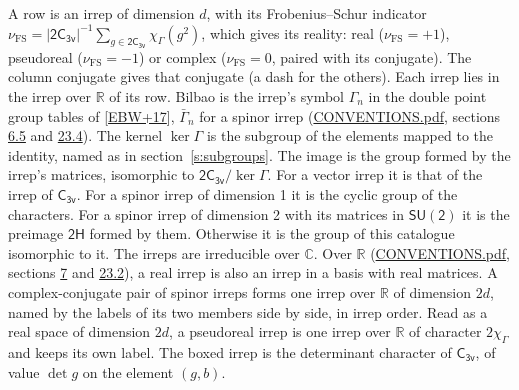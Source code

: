 \documentclass[10pt,a4paper]{article}
\numberwithin{equation}{section}
\newcommand{\grp}[1]{\mathsf{#1}}
\newcommand{\irchar}[1]{\chi_{#1}}
\newcommand{\fsind}{\nu_{\mathrm{FS}}}
\begin{document}
\leavevmode\label{n:index.frobenius}\label{n:head.irrep}\label{n:head.reality}A row is an irrep of dimension $d$, with its Frobenius--Schur indicator $\fsind = |\grp{2C_{3v}}|^{-1}\allowbreak\sum_{g\in\grp{2C_{3v}}}\irchar{\Gamma}(g^2)$, which gives its reality: real ($\fsind = +1$), pseudoreal ($\fsind = -1$) or complex ($\fsind = 0$, paired with its conjugate). \label{n:head.conjugate}The column conjugate gives that conjugate (a dash for the others). \label{n:head.over.real}Each irrep lies in the irrep over $\mathbb{R}$ of its row. \label{n:head.bilbao}\label{n:irrep.alias.gamma}Bilbao is the irrep's symbol $\Gamma_n$ in the double point group tables of [\href{../../../REFERENCES.pdf\#ref.EBW+17}{EBW+17}], $\bar{\Gamma}_n$ for a spinor irrep (\href{../../CONVENTIONS.pdf}{CONVENTIONS.pdf}, sections \href{../../../rotation/CONVENTIONS.pdf\#conv.6.5}{6.5} and \href{../../CONVENTIONS.pdf\#conv.23.4}{23.4}). \label{n:head.kernel}The kernel $\ker\Gamma$ is the subgroup of the elements mapped to the identity, named as in section~\ref{s:subgroups}. \label{n:head.image}The image is the group formed by the irrep's matrices, isomorphic to $\grp{2C_{3v}}/\ker\Gamma$. For a vector irrep it is that of the irrep of \href{../../../rotation/data/pdf/C3v.pdf}{$\grp{C_{3v}}$}. For a spinor irrep of dimension 1 it is the cyclic group of the characters. For a spinor irrep of dimension 2 with its matrices in $\grp{SU(2)}$ it is the preimage $\grp{2H}$ formed by them. Otherwise it is the group of this catalogue isomorphic to it. The irreps are irreducible over $\mathbb{C}$. Over $\mathbb{R}$ (\href{../../CONVENTIONS.pdf}{CONVENTIONS.pdf}, sections \href{../../../rotation/CONVENTIONS.pdf\#conv.7}{7} and \href{../../CONVENTIONS.pdf\#conv.23.2}{23.2}), a real irrep is also an irrep in a basis with real matrices. A complex-conjugate pair of spinor irreps forms one irrep over $\mathbb{R}$ of dimension $2d$, named by the labels of its two members side by side, in irrep order. Read as a real space of dimension $2d$, a pseudoreal irrep is one irrep over $\mathbb{R}$ of character $2\irchar{\Gamma}$ and keeps its own label. \label{n:mark.determinant}The boxed irrep is the determinant character of \href{../../../rotation/data/pdf/C3v.pdf}{$\grp{C_{3v}}$}, of value $\det g$ on the element $(g, b)$.
\setlength{\emergencystretch}{2em}\par\setlength{\emergencystretch}{0pt}
\end{document}

